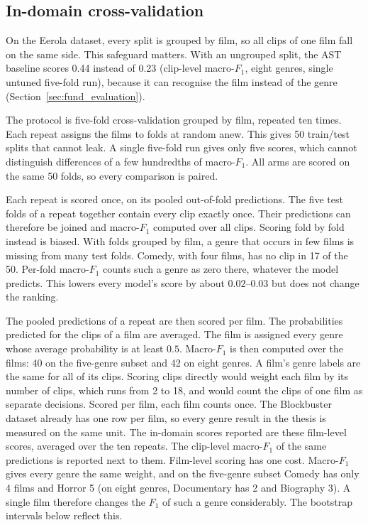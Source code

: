 \subsection{In-domain cross-validation}

On the Eerola dataset, every split is grouped by film, so all clips of one film fall on the same side. This safeguard matters. With an ungrouped split, the AST baseline scores 0.44 instead of 0.23 (clip-level macro-$F_1$, eight genres, single untuned five-fold run), because it can recognise the film instead of the genre (Section~\ref{sec:fund_evaluation}). 

The protocol is five-fold cross-validation grouped by film, repeated ten times. Each repeat assigns the films to folds at random anew. This gives 50 train/test splits that cannot leak. A single five-fold run gives only five scores, which cannot distinguish differences of a few hundredths of macro-$F_1$. All arms are scored on the same 50 folds, so every comparison is paired.

Each repeat is scored once, on its pooled out-of-fold predictions. The five test folds of a repeat together contain every clip exactly once. Their predictions can therefore be joined and macro-$F_1$ computed over all clips. Scoring fold by fold instead is biased. With folds grouped by film, a genre that occurs in few films is missing from many test folds. Comedy, with four films, has no clip in 17 of the 50. Per-fold macro-$F_1$ counts such a genre as zero there, whatever the model predicts. This lowers every model's score by about $0.02$--$0.03$ but does not change the ranking.

The pooled predictions of a repeat are then scored per film. The probabilities predicted for the clips of a film are averaged. The film is assigned every genre whose average probability is at least $0.5$. Macro-$F_1$ is then computed over the films: 40 on the five-genre subset and 42 on eight genres. A film's genre labels are the same for all of its clips. Scoring clips directly would weight each film by its number of clips, which runs from 2 to 18, and would count the clips of one film as separate decisions. Scored per film, each film counts once. The Blockbuster dataset already has one row per film, so every genre result in the thesis is measured on the same unit. The in-domain scores reported are these film-level scores, averaged over the ten repeats. The clip-level macro-$F_1$ of the same predictions is reported next to them. Film-level scoring has one cost. Macro-$F_1$ gives every genre the same weight, and on the five-genre subset Comedy has only 4 films and Horror 5 (on eight genres, Documentary has 2 and Biography 3). A single film therefore changes the $F_1$ of such a genre considerably. The bootstrap intervals below reflect this.

